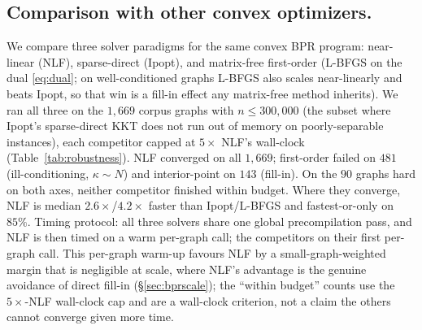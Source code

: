 \documentclass{siamart220329}
\begin{document}
\subsection{Comparison with other convex optimizers.}\label{sec:frontier}
We compare three solver paradigms for the same convex BPR program: near-linear (NLF), sparse-direct
(Ipopt), and matrix-free first-order (L-BFGS on the dual \eqref{eq:dual}; on well-conditioned graphs
L-BFGS also scales near-linearly and beats Ipopt, so that win is a fill-in effect any matrix-free
method inherits). We ran all three on the $1{,}669$ corpus graphs with $n\le300{,}000$ (the subset where Ipopt's sparse-direct KKT does not run out of memory on poorly-separable instances), each competitor capped at $5\times$ NLF's wall-clock (Table~\ref{tab:robustness}).
NLF converged on all $1{,}669$; first-order failed on $481$ (ill-conditioning,
$\kappa\sim N$) and interior-point on $143$ (fill-in). On the $90$ graphs hard on both axes,
neither competitor finished within budget. Where they converge, NLF is median
$2.6\times$/$4.2\times$ faster than Ipopt/L-BFGS and fastest-or-only on $85\%$.
Timing protocol: all three solvers share one global precompilation pass, and NLF is then timed on a
warm per-graph call; the competitors on their first per-graph call. This per-graph warm-up favours NLF
by a small-graph-weighted margin that is negligible at scale, where NLF's advantage is the genuine
avoidance of direct fill-in (\S\ref{sec:bprscale}); the ``within budget'' counts use the $5\times$-NLF
wall-clock cap and are a wall-clock criterion, not a claim the others cannot converge given more time.
\end{document}
